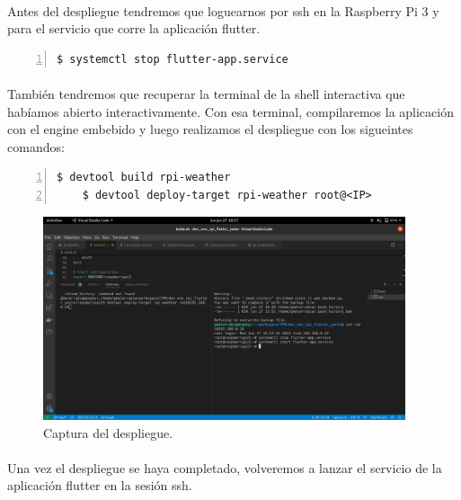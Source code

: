\paragraph{}Antes del despliegue tendremos que loguearnos por ssh en la Raspberry Pi 3
y para el servicio que corre la aplicación flutter.

\begin{lstlisting}[style=consola, numbers=left]
    $ systemctl stop flutter-app.service
\end{lstlisting}

\paragraph{}También tendremos que recuperar la terminal de la shell interactiva que habíamos
abierto interactivamente. Con esa terminal, compilaremos la aplicación con el engine
embebido y luego realizamos el despliegue con los sigueintes comandos:

\begin{lstlisting}[style=consola, numbers=left]
    $ devtool build rpi-weather
    $ devtool deploy-target rpi-weather root@<IP>
\end{lstlisting}

\begin{figure}[H]
    \centering
    \includegraphics[width=0.95\textwidth]{imgs/dev3}
    \caption[Captura del despliegue.]{Captura del despliegue.}
    \label{imgs:deploy-target}
\end{figure}

\paragraph{}Una vez el despliegue se haya completado, volveremos a lanzar el servicio
de la aplicación flutter en la sesión ssh.


